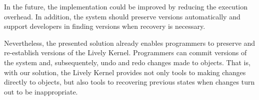 In the future, the implementation could be improved by reducing the execution overhead.
In addition, the system should preserve versions automatically and support developers in finding versions when recovery is necessary.

Nevertheless, the presented solution already enables programmers to preserve and re-establish versions of the Lively Kernel.
Programmers can commit versions of the system and, subsequentely, undo and redo changes made to objects.
That is, with our solution, the Lively Kernel provides not only tools to making changes directly to objects, but also tools to recovering previous states when changes turn out to be inappropriate.

% 
% 
% 
% 
% 
% 
% 


% 



